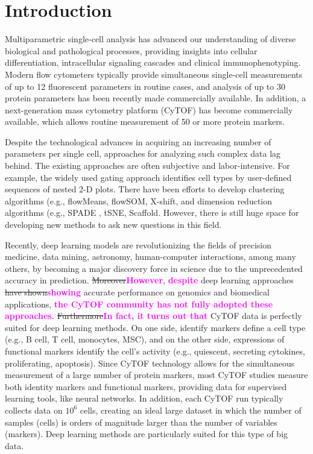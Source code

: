 \documentclass[graybox]{svmult}
\newcommand{\claudia}[2]{\sout{#1}\textcolor{magenta}{\textbf{#2}}}
\begin{document}
\section{Introduction}

Multiparametric single-cell analysis has advanced our understanding of
diverse biological and pathological processes, providing insights into
cellular differentiation, intracellular signaling cascades and
clinical immunophenotyping. Modern flow cytometers typically provide
simultaneous single-cell measurements of up to 12 fluorescent
parameters in routine cases, and analysis of up to 30 protein
parameters has been recently made commercially available. In addition,
a next-generation mass cytometry platform (CyTOF) has become
commercially available, which allows routine measurement of 50 or more
protein markers.

Despite the technological advances in acquiring an increasing number
of parameters per single cell, approaches for analyzing such complex
data lag behind. The existing approaches are often subjective and
labor-intensive. For example, the widely used gating approach
identifies cell types by user-defined sequences of nested 2-D
plots. There have been efforts to develop clustering algorithms (e.g.,
flowMeans\cite{Aghaeepour2010}, flowSOM\cite{VanGassen2015},
X-shift\cite{Samusik2016}, and dimension reduction algorithms
(e.g., SPADE \cite{Qiu2011}, tSNE\cite{vanderMaaten2008},
Scaffold\cite{Spitzer2015}. However, there is still huge space
for developing new methods to ask new questions in this field.

Recently, deep learning models are revolutionizing the fields of
precision medicine, data mining, astronomy, human-computer
interactions, among many others, by becoming a major discovery force
in science due to the unprecedented accuracy in prediction.
\claudia{Moreover}{However}, \claudia{}{despite} deep learning
approaches \claudia{have shown}{showing} accurate performance on
genomics and biomedical
applications\cite{Ciresan2013,Denas2013,Fakoor2013,Leung2014,CruzRoa2014,Li2017,Mobadersany2018},
\claudia{}{the CyTOF community has not fully adopted these
  approaches.}  \claudia{Furthermore}{In fact, it turns out that}
CyTOF data is perfectly suited for deep learning methods.  On one
side, identify markers define a cell type (e.g., B cell, T cell,
monocytes, MSC), and on the other side, expressions of functional
markers identify the cell's activity (e.g., quiescent, secreting
cytokines, proliferating, apoptosis). Since CyTOF technology allows
for the simultaneous measurement of a large number of protein markers,
most CyTOF studies measure both identity markers and functional
markers, providing data for supervised learning tools, like neural
networks.  In addition, each CyTOF run typically collects data on
$10^6$ cells, creating an ideal large dataset in which the number of
samples (cells) is orders of magnitude larger than the number of
variables (markers). Deep learning methods are particularly suited for
this type of big data.
\end{document}
